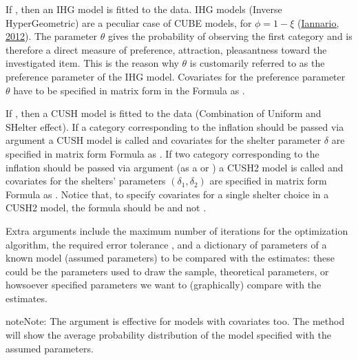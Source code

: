 \documentclass[letterpaper,10pt,english]{sphinxmanual}
\begin{document}
\sphinxAtStartPar
If , then an IHG model is fitted to the data. IHG models (Inverse HyperGeometric) are a peculiar case of
CUBE models, for \(\phi = 1 - \xi\) (\hyperlink{cite.references:id15}{Iannario, 2012}). The parameter \(\theta\) gives the probability of observing
the first category and is therefore a direct measure of preference, attraction, pleasantness toward the
investigated item. This is the reason why \(\theta\) is customarily referred to as the
preference parameter of the
IHG model. Covariates for the preference parameter \(\theta\) have to be specified
in matrix form in the Formula as .

\sphinxAtStartPar
If , then a CUSH model is fitted to the data (Combination of Uniform and SHelter effect).
If a category corresponding to the inflation should be
passed via argument  a CUSH model is called and
covariates for the shelter parameter \(\delta\)
are specified in matrix form Formula as .
If two category corresponding to the inflation should be
passed via argument  (as a  or ) a CUSH2 model is called and
covariates for the shelters’ parameters \((\delta_1,\delta_2)\)
are specified in matrix form Formula as .
Notice that, to specify covariates for a
single shelter choice in a CUSH2 model,
the formula should be  and not .

\sphinxAtStartPar
Extra arguments include the maximum
number of iterations  for the optimization algorithm,
the required error tolerance , and a dictionary of parameters of a known model
 (assumed parameters) to be compared with the estimates: these could be
the parameters used to draw the sample, theoretical parameters, or howsoever specified
parameters we want to (graphically) compare with the estimates.

\begin{sphinxadmonition}{note}{Note:}
\sphinxAtStartPar
The  argument is effective for models with covariates too.
The  method will show the average probability distribution of the model specified
with the assumed parameters.
\end{sphinxadmonition}
\end{document}
